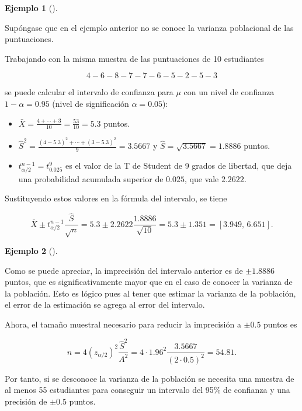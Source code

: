 \documentclass[
  a4paper,
]{scrreport}
\providecommand{\tightlist}{%
  \setlength{\itemsep}{0pt}\setlength{\parskip}{0pt}}\usepackage{longtable,booktabs,array}
\theoremstyle{definition}
\theoremstyle{definition}
\newtheorem{example}{Ejemplo}[chapter]
\theoremstyle{plain}
\theoremstyle{remark}
\begin{document}
\begin{example}[]\protect\hypertarget{exm-intervalo-confianza-media-normal-varianza-desconocida}{}\label{exm-intervalo-confianza-media-normal-varianza-desconocida}

Supóngase que en el ejemplo anterior no se conoce la varianza
poblacional de las puntuaciones.

Trabajando con la misma muestra de las puntuaciones de 10 estudiantes

\[
4 - 6 - 8 - 7 - 7 - 6 - 5 - 2 - 5 - 3
\]

se puede calcular el intervalo de confianza para \(\mu\) con un nivel de
confianza \(1-\alpha=0.95\) (nivel de significación \(\alpha=0.05\)):

\begin{itemize}
\tightlist
\item
  \(\bar X = \frac{4+\cdots+3}{10}= \frac{53}{10} = 5.3\) puntos.
\item
  \(\hat{S}^2= \frac{(4-5.3)^2+\cdots+(3-5.3)^2}{9} = 3.5667\) y
  \(\hat{S}=\sqrt{3.5667}=1.8886\) puntos.
\item
  \(t^{n-1}_{\alpha/2}=t^9_{0.025}\) es el valor de la T de Student de 9
  grados de libertad, que deja una probabilidad acumulada superior de
  \(0.025\), que vale \(2.2622\).
\end{itemize}

Sustituyendo estos valores en la fórmula del intervalo, se tiene

\[
\bar{X}\pm t^{n-1}_{\alpha/2}\frac{\hat{S}}{\sqrt{n}} = 5.3\pm 2.2622\frac{1.8886}{\sqrt{10}} = 5.3\pm 1.351 = \left[3.949,\,6.651\right].
\]

\end{example}

\begin{example}[]\protect\hypertarget{exm-tamaño-muestral-ntervalo-confianza-media-normal-varianza-desconocida}{}\label{exm-tamaño-muestral-ntervalo-confianza-media-normal-varianza-desconocida}

Como se puede apreciar, la imprecisión del intervalo anterior es de
\(\pm 1.8886\) puntos, que es significativamente mayor que en el caso de
conocer la varianza de la población. Esto es lógico pues al tener que
estimar la varianza de la población, el error de la estimación se agrega
al error del intervalo.

Ahora, el tamaño muestral necesario para reducir la imprecisión a
\(\pm 0.5\) puntos es

\[
n = 4 (z_{\alpha/2})^2\frac{\hat{S}^2}{A^2} = 4\cdot 1.96^2\frac{3.5667}{(2\cdot 0.5)^2} = 54.81.
\]

Por tanto, si se desconoce la varianza de la población se necesita una
muestra de al menos 55 estudiantes para conseguir un intervalo del 95\%
de confianza y una precisión de \(\pm 0.5\) puntos.

\end{example}
\end{document}
